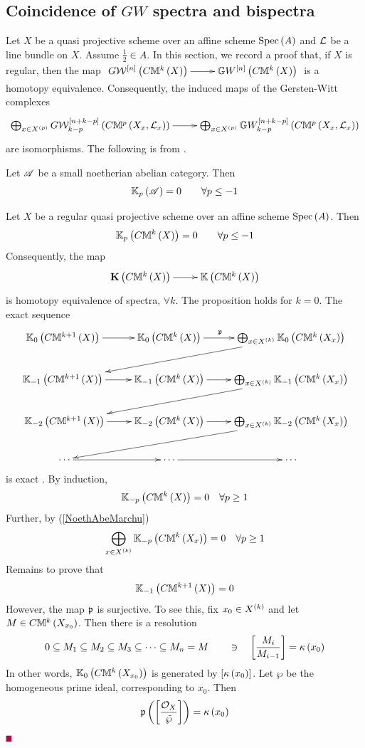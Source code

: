 \documentclass[12pt]{article}
\begin{document}
\subsection{Coincidence of $GW$ spectra and bispectra} 
Let $X$ be a quasi projective  scheme over an affine scheme $\mathrm{Spec}\left(A\right)$ and ${\mathcal{L}}$ be a line bundle on $X$.
Assume $\frac{1}{2}\in A$. 
 In this section, we record a proof that, if $X$ is regular, then the map $\diagram G{\CW}^{\LRt{n}}\LRf{C{\BM}^k\LRf{X}} \ar[r] & {\BG}{W}^{\LRt{n}}\LRf{C{\BM}^k\LRf{X}} \\ \enddiagram$ is a homotopy equivalence. Consequently, the induced maps of  the Gersten-Witt
complexes
$$
\diagram
\bigoplus_{x\in X^{\LRf{p}}}G{\CW}^{\LRt{n+k-p}}_{k-p}\LRf{C{\BM}^p\LRf{X_x, {\CL}_x}}
\ar[r] &\bigoplus_{x\in X^{\LRf{p}}}{\BG}{W}^{\LRt{n+k-p}}_{k-p}\LRf{C{\BM}^p\LRf{X_x, {\CL}_x}}
\enddiagram
$$
are  isomorphisms. 
The following is from \cite[Thm 7]{S06}.
\bT\label{NoethAbeMarchu} {\rm 
Let ${\mathscr {A}}$ be a small noetherian abelian category. Then 
$$
{\mathbb{K}}_p\left( {\mathscr {A}}\right)= 0 \qquad \forall p\leq -1
$$

}\eT

\bP\label{negKgrzero}{\rm 
Let $X$ be a regular quasi projective scheme
over an affine scheme $\mathrm{Spec}\left(A\right)$.
Then 
$$
{\mathbb{K}}_p\left( C{\mathbb{M}}^k\left( X\right)\right)=0 \qquad \forall p\leq -1
$$
Consequently, the map
$$
\diagram 
{\bfK}\LRf{C{\BM}^k\LRf{X}}\ar[r] & {\BK}\LRf{C{\BM}^k\LRf{X}}
\enddiagram
$$
is homotopy equivalence of spectra, $\forall k$. 
}
\eP
\pf The proposition holds for $k=0$. The exact sequence 
$$
\diagram 
{\BK}_0\LRf{C{\BM}^{k+1}\LRf{X}} \ar[r] & {\BK}_0\LRf{C{\BM}^{k}\LRf{X}}  \ar[r]^{\p\qquad } & \bigoplus_{x\in X^{\LRf{k}}} 
{\BK}_0\LRf{C{\BM}^{k}\LRf{X_x}} \ar[dll]\\
{\BK}_{-1}\LRf{C{\BM}^{k+1}\LRf{X}} \ar[r] & {\BK}_{-1}\LRf{C{\BM}^{k}\LRf{X}}  \ar[r] & \bigoplus_{x\in X^{\LRf{k}}} 
{\BK}_{-1}\LRf{C{\BM}^{k}\LRf{X_x}} \ar[dll]\\\
{\BK}_{-2}\LRf{C{\BM}^{k+1}\LRf{X}} \ar[r] & {\BK}_{-2}\LRf{C{\BM}^{k}\LRf{X}}  \ar[r] & \bigoplus_{x\in X^{\LRf{k}}} 
{\BK}_{-2}\LRf{C{\BM}^{k}\LRf{X_x}}\ar[dll]\\\
\cdots \ar[r] & \cdots\ar[r] & \cdots \\
\enddiagram
$$
is exact \cite[pp 414]{M23}.
By induction,
$$
{\mathbb{K}}_{-p}\left( C{\mathbb{M}}^{k}\left( X\right)\right) =0 \quad \forall p\geq 1
$$
Further, by (\ref{NoethAbeMarchu}) 
$$
 \bigoplus_{x\in X^{\left( k\right)}} 
{\mathbb{K}}_{-p}\left( C{\mathbb{M}}^{k}\left( X_x\right)\right)=0 \quad \forall p\geq 1
$$
Remains to prove that
$$
{\mathbb{K}}_{-1}\left( C{\mathbb{M}}^{k+1}\left( X\right)\right) =0
$$
However, the map $\mathfrak {p}$ is surjective. To see this, fix $x_0\in X^{\left( k\right)}$ and let $M\in C{\mathbb{M}}^k\left( X_{x_0}\right)$. Then there is a resolution 
$$
0 \subseteq M_1 \subseteq M_2 \subseteq M_3 \subseteq \cdots \subseteq M_n=M
\qquad \ni \quad \left[ \frac{M_i}{M_{i-1}}\right]= \kappa\left( x_0\right)
$$
In other words, 
${\mathbb{K}}_0\left( C{\mathbb{M}}^{k}\left( X_{x_0}\right) \right)$ is generated by $\left[ \kappa\left( x_0\right)\right]$. Let ${\wp}$ be the
homogeneous prime ideal, corresponding to $x_0$. Then 
$$
\mathfrak {p}\left( \left[ \frac{{\mathcal{O}}_X}{\tilde{{\wp}}}\right]\right)=\kappa\left( x_0\right)
$$
\pic $\eop$
\end{document}
